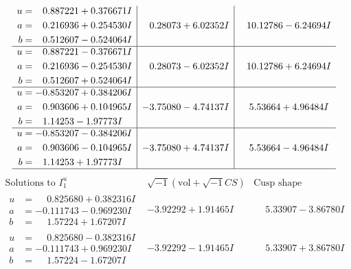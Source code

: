 \documentclass[1p]{elsarticle_modified}
\theoremstyle{definition}
\newcommand{\I}{\sqrt{-1}}
\begin{document}
$$\begin{array}{c|c|c}
\begin{aligned}
u &= \phantom{-}0.887221 + 0.376671 I \\
a &= \phantom{-}0.216936 + 0.254530 I \\
b &= \phantom{-}0.512607 - 0.524064 I\end{aligned}
 & \phantom{-}0.28073 + 6.02352 I & \phantom{-}10.12786 - 6.24694 I \\ \hline\begin{aligned}
u &= \phantom{-}0.887221 - 0.376671 I \\
a &= \phantom{-}0.216936 - 0.254530 I \\
b &= \phantom{-}0.512607 + 0.524064 I\end{aligned}
 & \phantom{-}0.28073 - 6.02352 I & \phantom{-}10.12786 + 6.24694 I \\ \hline\begin{aligned}
u &= -0.853207 + 0.384206 I \\
a &= \phantom{-}0.903606 + 0.104965 I \\
b &= \phantom{-}1.14253 - 1.97773 I\end{aligned}
 & -3.75080 - 4.74137 I & \phantom{-}5.53664 + 4.96484 I \\ \hline\begin{aligned}
u &= -0.853207 - 0.384206 I \\
a &= \phantom{-}0.903606 - 0.104965 I \\
b &= \phantom{-}1.14253 + 1.97773 I\end{aligned}
 & -3.75080 + 4.74137 I & \phantom{-}5.53664 - 4.96484 I\\
 \hline 
 \end{array}$$\newpage$$\begin{array}{c|c|c}  
\text{Solutions to }I^u_{1}& \I (\text{vol} + \sqrt{-1}CS) & \text{Cusp shape}\\
 \hline 
\begin{aligned}
u &= \phantom{-}0.825680 + 0.382316 I \\
a &= -0.111743 - 0.969230 I \\
b &= \phantom{-}1.57224 + 1.67207 I\end{aligned}
 & -3.92292 + 1.91465 I & \phantom{-}5.33907 - 3.86780 I \\ \hline\begin{aligned}
u &= \phantom{-}0.825680 - 0.382316 I \\
a &= -0.111743 + 0.969230 I \\
b &= \phantom{-}1.57224 - 1.67207 I\end{aligned}
 & -3.92292 - 1.91465 I & \phantom{-}5.33907 + 3.86780 I \\ \hline\begin{aligned}

\end{aligned}
\end{array}$$
\end{document}
